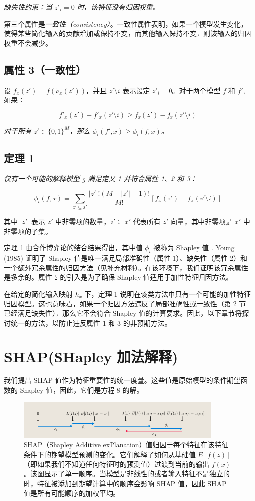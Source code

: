\documentclass[12pt, a4paper]{ctexart} %
\begin{document}
\textit{缺失性约束：当 $z'_i = 0$ 时，该特征没有归因权重。}

第三个属性是\textit{一致性（consistency）}。一致性属性表明，如果一个模型发生变化，使得某些简化输入的贡献增加或保持不变，而其他输入保持不变，则该输入的归因权重不会减少。

\subsection*{属性 3（一致性）} 
设 $f_x(z') = f(h_x(z'))$，并且 $z' \setminus i$ 表示设定 $z'_i = 0$。对于两个模型 $f$ 和 $f'$, 如果：

\[
f'_x(z') - f'_x(z' \setminus i) \geq f_x(z') - f_x(z' \setminus i)
\]

\textit{对于所有 $z' \in \{0,1\}^M$，那么 $\phi_i(f',x) \geq \phi_i(f,x)$。}

\subsection*{定理 1}
\textit{仅有一个可能的解释模型 $g$ 满足定义 1 并符合属性 1、2 和 3：}

\[
\phi_i(f, x) = \sum_{z' \subseteq x'} \frac{|z'|!(M - |z'| -1)!}{M!} \left[ f_x(z') - f_x(z' \setminus i) \right]
\]

其中 $|z'|$ 表示 $z'$ 中非零项的数量，$z' \subseteq x'$ 代表所有 $z'$ 向量，其中非零项是 $x'$ 中非零项的子集。

定理 1 由合作博弈论的结合结果得出，其中值 $\phi_i$ 被称为 Shapley 值 \cite{shapley}. Young (1985) 证明了 Shapley 值是唯一满足局部准确性（属性 1）、缺失性（属性 2）和一个额外冗余属性的归因方法（见补充材料）。在该环境下，我们证明该冗余属性是多余的。属性 2 的引入是为了确保 Shapley 值适用于加性特征归因方法。

在给定的简化输入映射 $h_x$ 下，定理 1 说明在该类方法中只有一个可能的加性特征归因模型。这也意味着，如果一个归因方法违反了局部准确性或一致性（第 2 节已经满足缺失性），那么它不会符合 Shapley 值的计算要求。因此，以下章节将探讨统一的方法，以防止违反属性 1 和 3 的非预期方法。

\section{SHAP(SHapley 加法解释)}
我们提出 SHAP 值作为特征重要性的统一度量。这些值是原始模型的条件期望函数的 Shapley 值，因此，它们是方程 8 的解。

\begin{figure}[h]
    \centering
    \includegraphics[width=0.9\textwidth]{img/img_1.png}
    \caption{SHAP（Shapley Additive exPlanation）值归因于每个特征在该特征条件下的期望模型预测的变化。它们解释了如何从基础值 $E[f(z)]$（即如果我们不知道任何特征时的预测值）过渡到当前的输出 $f(x)$。该图显示了单一顺序。当模型是非线性的或者输入特征不是独立的时，特征被添加到期望计算中的顺序会影响 SHAP 值，因此 SHAP 值是所有可能顺序的加权平均。}
\end{figure}
\end{document}
